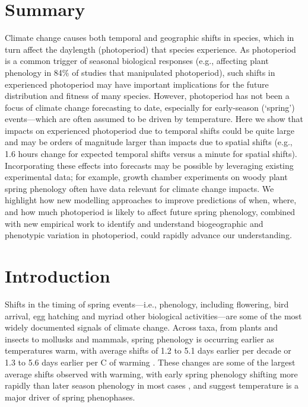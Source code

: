 \documentclass{article}
\begin{document}
\section*{Summary}
Climate change causes both temporal and geographic shifts in species, which in turn affect the daylength (photoperiod) that species experience. As photoperiod is a common trigger of seasonal biological responses (e.g., affecting plant phenology in 84\% of studies that manipulated photoperiod), such shifts in experienced photoperiod may have important implications for the future distribution and fitness of many species. However, photoperiod has not been a focus of climate change forecasting to date, especially for early-season (`spring') events---which are often assumed to be driven by temperature. Here we show that impacts on experienced photoperiod due to temporal shifts could be quite large and may be orders of magnitude larger than impacts due to spatial shifts (e.g., 1.6 hours change for expected temporal shifts versus a minute for spatial shifts). Incorporating these effects into forecasts may be possible by leveraging existing experimental data; for example, growth chamber experiments on woody plant spring phenology often have data relevant for climate change impacts. We highlight how new modelling approaches to improve predictions of when, where, and how much photoperiod is likely to affect future spring phenology, combined with new empirical work to identify and understand biogeographic and phenotypic variation in photoperiod, could rapidly advance our understanding. %

\section*{Introduction}
\par Shifts in the timing of spring events---i.e., phenology, including flowering, bird arrival, egg hatching and myriad other biological activities---are some of the most widely documented signals of climate change. Across taxa, from plants and insects to mollusks and mammals, spring phenology is occurring earlier as temperatures warm, with average shifts of 1.2 to 5.1 days earlier per decade \citep{bradley1999,parmesan2003, root2003} or 1.3 to 5.6 days earlier per \degree C of warming \citep{Wolkovich:2012n,polgar2013}. These changes are some of the largest average shifts observed with warming, with early spring phenology shifting more rapidly than later season phenology in most cases \citep{bradley1999,menzel2006}, and suggest temperature is a major driver of spring phenophases.
\end{document}
